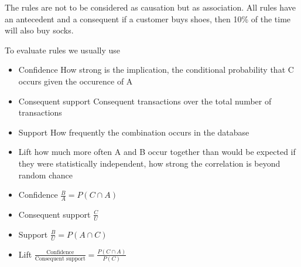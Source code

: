 The rules are not to be considered as causation but as association. All rules have an antecedent and a consequent \ra if a customer buys shoes, then 10\% of the time will also buy socks.

\vspace{10pt}

To evaluate rules we usually use

\begin{itemize}
    \item Confidence \ra How strong is the implication, the conditional probability that C occurs given the occurence of A
    \item Consequent support \ra Consequent transactions over the total number of transactions
    \item Support \ra How frequently the combination occurs in the database
    \item Lift \ra how much more often A and B occur together than would be expected if they were statistically independent, how strong the correlation is beyond random chance
\end{itemize}



\begin{itemize}
    \item Confidence \ra $\frac{B}{A} = P(C \cap A)$
    \item Consequent support \ra $\frac{C}{U}$
    \item Support \ra $\frac{B}{U} = P(A \cap C)$
    \item Lift \ra $\frac{\text{Confidence}}{\text{Consequent support}} = \frac{P(C \cap A)}{P(C)}$
\end{itemize}


\vspace{10pt}

